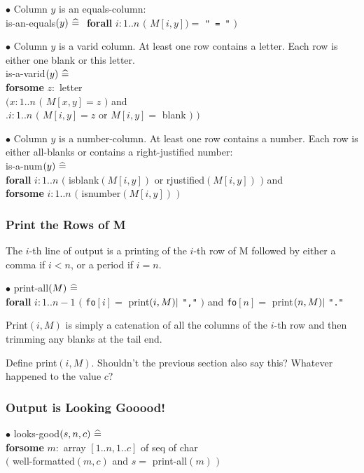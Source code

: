 \documentclass[12pt]{article}
\def\zdef{\bf\ \widehat{=}\ }
\def\vbar{{\tt |}}
\def\forall{{\bf forall }}
\def\forsome{{\bf forsome }}
\def\ffo{{\tt fo}}
\begin{document}
$\bullet$
Column $y$ is an equals-column:\\
is-an-equals$(y) \zdef $
\forall $i: 1..n$ $($ $M[i, y]) = $ \verb|" = "| $)$

$\bullet$
Column $y$ is a varid column.  At least one row contains a letter.
Each row is either one blank or this letter.\\

is-a-varid$(y) \zdef $\\
\forsome  $z:$ letter\\
$($\quad \forsome  $x: 1..n$ $($ $M[x, y] = z$ $)$ and \\
.\quad \forall $i: 1..n$ $($ $M[i, y] = z$ or $M[i, y] = $ blank $)$ $)$

$\bullet$
Column $y$ is a number-column.  At least one row contains a number.
Each row is either all-blanks or contains a right-justified number:\\
is-a-num$(y) \zdef $\\
\forall $i: 1..n$ $($ isblank$(M[i, y])$ or rjustified$(M[i, y])$ $)$ and\\
\forsome  $i: 1..n$ $($ isnumber$(M[i, y])$ $)$

\subsubsection{Print the Rows of M}

The $i$-th line of output is a printing of the $i$-th row of M followed by
either a comma if $i < n$, or a period if $i = n$.

$\bullet$
print-all$(M) \zdef$\\
\forall $i: 1..n-1$ $($
\ffo$[i] = $ print$(i, M) \vbar $ {\tt ","} $)$ and
\ffo$[n] = $ print$(n, M) \vbar $ {\tt "."}


Print$(i, M)$ is simply a catenation of all the columns of the $i$-th
row and then trimming any blanks at the tail end.

{\small Define print$(i, M)$.
Shouldn't the previous section also say this?  Whatever happened to
the value $c$?  }

\subsubsection{Output is Looking Gooood!}

$\bullet$
looks-good$(s, n, c) \zdef$\\
\forsome $m:$ array $[1..n, 1..c]$ of seq of char\\
$($ well-formatted$(m, c)$ and $ s =$ print-all$(m)$ $)$
\end{document}
